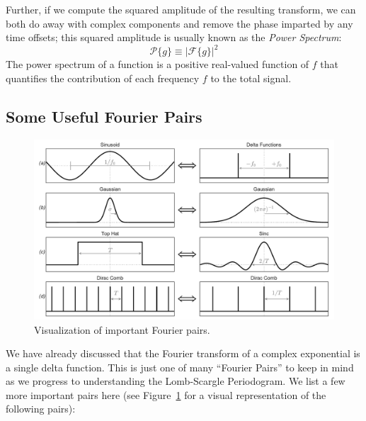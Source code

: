 \documentclass[preprint]{aastex}
\newcommand{\Fig}[1]{Figure~\ref{fig:#1}}
\newcommand{\figlabel}[1]{\label{fig:#1}}
\newcommand{\eqlabel}[1]{\label{eq:#1}}
\begin{document}
Further, if we compute the squared amplitude of the resulting transform, we can both do away with complex components and remove the phase imparted by any time offsets; this squared amplitude is usually known as the {\it Power Spectrum}:
\begin{equation}
  \mathcal{P}\{g\} \equiv \left|\mathcal{F}\{g\}\right|^2
  \eqlabel{power-spectrum}
\end{equation}
The power spectrum of a function is a positive real-valued function of $f$ that quantifies the contribution of each frequency $f$ to the total signal.

\subsection{Some Useful Fourier Pairs}

\begin{figure}[ht]
\centering
\includegraphics[width=\textwidth]{fig03_Fourier_pairs}
\caption{Visualization of important Fourier pairs.\figlabel{fourier-pairs}}
\end{figure}

We have already discussed that the Fourier transform of a complex exponential is a single delta function.
This is just one of many ``Fourier Pairs'' to keep in mind as we progress to understanding the Lomb-Scargle Periodogram.
We list a few more important pairs here (see \Fig{fourier-pairs} for a visual representation of the following pairs):
\end{document}
